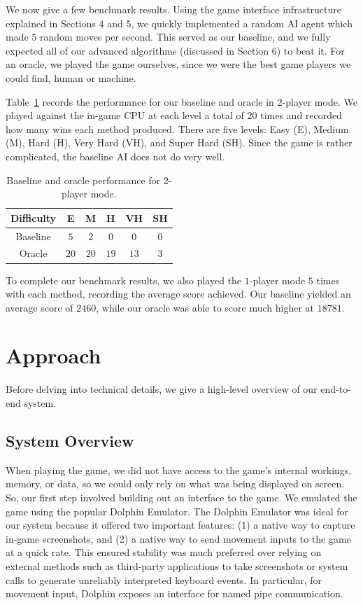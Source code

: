 \documentclass[12pt]{IEEEtran}
\begin{document}
We now give a few benchmark results. Using the game interface infrastructure explained in Sections $4$ and $5$, we quickly implemented a random AI agent which made $5$ random moves per second. This served as our baseline, and we fully expected all of our advanced algorithms (discussed in Section $6$) to beat it. For an oracle, we played the game ourselves, since we were the best game players we could find, human or machine.

Table~\ref{tab:baseline} records the performance for our baseline and oracle in $2$-player mode. We played against the in-game CPU at each level a total of $20$ times and recorded how many wins each method produced. There are five levels: Easy (E), Medium (M), Hard (H), Very Hard (VH), and Super Hard (SH). Since the game is rather complicated, the baseline AI does not do very well.

\begin{table}[ht]
\begin{center}
\begin{tabular}{c||c|c|c|c|c}
Difficulty & E & M & H & VH & SH \\ \hline\hline
Baseline & $5$ & $2$ & $0$ & $0$ & $0$ \\ \hline
Oracle & $20$ & $20$ & $19$ & $13$ & $3$
\end{tabular}
\end{center}
\caption{Baseline and oracle performance for $2$-player mode.}
\label{tab:baseline}
\end{table}

To complete our benchmark results, we also played the $1$-player mode $5$ times with each method, recording the average score achieved. Our baseline yielded an average score of $2460$, while our oracle was able to score much higher at $18781$.

\section{Approach}

Before delving into technical details, we give a high-level overview of our end-to-end system.

\subsection{System Overview}

When playing the game, we did not have access to the game's internal workings, memory, or data, so we could only rely on what was being displayed on screen. So, our first step involved building out an interface to the game. We emulated the game using the popular Dolphin Emulator. The Dolphin Emulator was ideal for our system because it offered two important features: (1) a native way to capture in-game screenshots, and (2) a native way to send movement inputs to the game at a quick rate. This ensured stability was much preferred over relying on external methods such as third-party applications to take screenshots or system calls to generate unreliably interpreted keyboard events. In particular, for movement input, Dolphin exposes an interface for named pipe communication.
\end{document}

